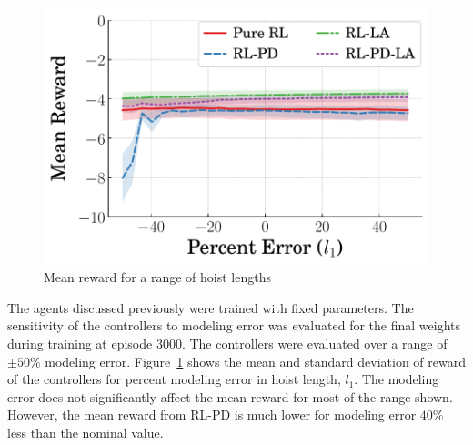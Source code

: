 \begin{figure}[tb]
    \centering
    \includegraphics[width=0.65\columnwidth]{figures/figures_robustness/dpcrane_robustness/L1_robustness.pdf}
    \vspace{-2ex}
    \caption{Mean reward for a range of hoist lengths}
    \label{fig:mean_reward_hoist_length}
\end{figure}
%
The agents discussed previously were trained with fixed parameters. The sensitivity of the controllers to modeling error was evaluated for the final weights during training at episode $3000$. The controllers were evaluated over a range of $\pm 50\%$ modeling error. Figure~\ref{fig:mean_reward_hoist_length} shows the mean and standard deviation of reward of the controllers for percent modeling error in hoist length, $l_1$.
The modeling error does not significantly affect the mean reward for most of the range shown. However, the mean reward from RL-PD is much lower for modeling error $40\%$ less than the nominal value.
%
